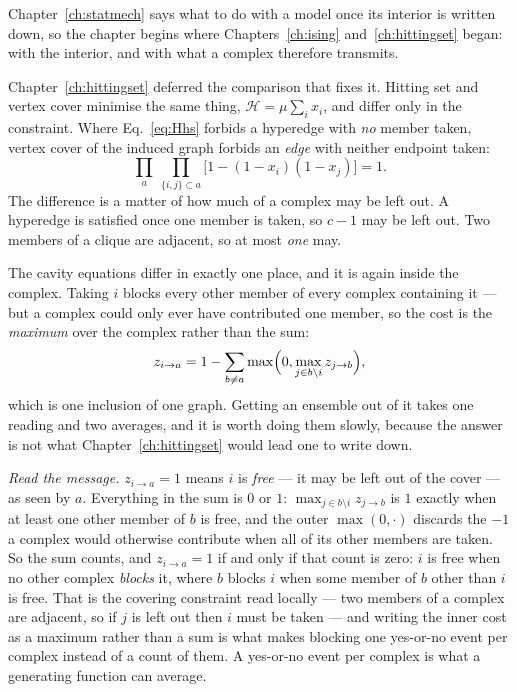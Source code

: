 Chapter~\ref{ch:statmech} says what to do with a model once its interior is
written down, so the chapter begins where Chapters~\ref{ch:ising}
and~\ref{ch:hittingset} began: with the interior, and with what a complex
therefore transmits.

Chapter~\ref{ch:hittingset} deferred the comparison that fixes it. Hitting set
and vertex cover minimise the same thing, $\mathcal{H}=\mu\sum_ix_i$, and differ
only in the constraint. Where Eq.~\eqref{eq:Hhs} forbids a hyperedge
with \emph{no} member taken, vertex cover of the induced graph forbids an
\emph{edge} with neither endpoint taken:
\begin{equation}
  \prod_{a}\ \prod_{\{i,j\}\subset a}
    \bigl[1-(1-x_{i})(1-x_{j})\bigr]=1.
  \label{eq:Hvc}
\end{equation}
The difference is a matter of how much of a complex may be left out. A hyperedge
is satisfied once one member is taken, so $c-1$ may be left out. Two members of
a clique are adjacent, so at most \emph{one} may.

The cavity equations differ in exactly one place, and it is again inside the
complex. Taking $i$ blocks every other member of every complex containing it ---
but a complex could only ever have contributed one member, so the cost is the
\emph{maximum} over the complex rather than the sum:
\begin{equation}
  z_{i\to a}=1-\sum_{b\ne a}\max\Bigl(0,\max_{j\in b\setminus i}z_{j\to b}\Bigr),
  \label{eq:vcz}
\end{equation}
which is one inclusion of one graph. Getting an ensemble out of it takes one
reading and two averages, and it is worth doing them slowly, because the answer
is not what Chapter~\ref{ch:hittingset} would lead one to write down.

\emph{Read the message.} $z_{i\to a}=1$ means $i$ is \emph{free} --- it may be
left out of the cover --- as seen by $a$. Everything in the sum is $0$ or $1$:
$\max_{j\in b\setminus i}z_{j\to b}$ is $1$ exactly when at least one other
member of $b$ is free, and the outer $\max(0,\cdot)$ discards the $-1$ a
complex would otherwise contribute when all of its other members are taken. So
the sum counts, and $z_{i\to a}=1$ if and only if that count is zero: $i$ is
free when no other complex \emph{blocks} it, where $b$ blocks $i$ when some
member of $b$ other than $i$ is free. That is the covering constraint read
locally --- two members of a complex are adjacent, so if $j$ is left out then
$i$ must be taken --- and writing the inner cost as a maximum rather than a sum
is what makes blocking one yes-or-no event per complex instead of a count of
them. A yes-or-no event per complex is what a generating function can average.

